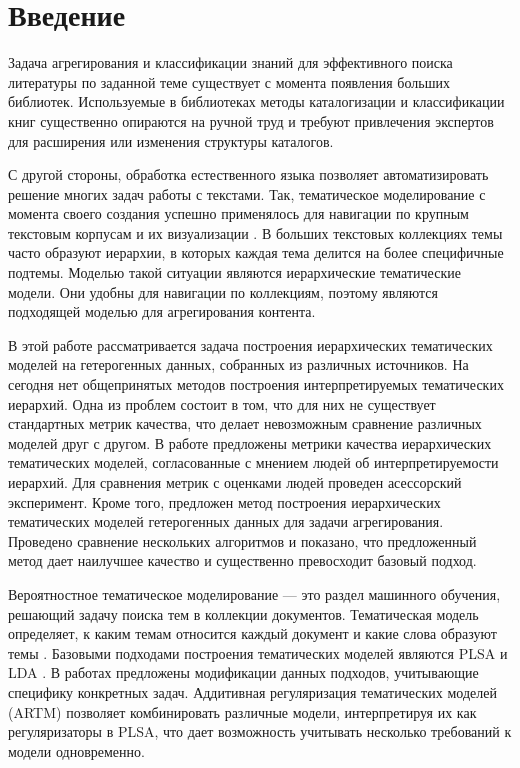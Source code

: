 \chapter{Введение}

Задача агрегирования и классификации знаний для эффективного поиска литературы по заданной теме существует с момента появления больших библиотек. Используемые в библиотеках методы каталогизации и классификации книг \cite{Sill2007} существенно опираются на ручной труд и требуют привлечения экспертов для расширения или изменения структуры каталогов.

С другой стороны, обработка естественного языка позволяет автоматизировать решение многих задач работы с текстами. Так, тематическое моделирование с момента своего создания успешно применялось для навигации по крупным текстовым корпусам и их визуализации \cite{Blei2007, Chaney2012, Chuang2012}. В больших текстовых коллекциях темы часто образуют иерархии, в которых каждая тема делится на более специфичные подтемы. Моделью такой ситуации являются иерархические тематические модели. Они удобны для навигации по коллекциям, поэтому являются подходящей моделью для агрегирования контента. 

В этой работе рассматривается задача построения иерархических тематических моделей на гетерогенных данных, собранных из различных источников. На сегодня нет общепринятых методов построения интерпретируемых тематических иерархий. Одна из проблем состоит в том, что для них не существует стандартных метрик качества, что делает невозможным сравнение различных моделей друг с другом. В работе предложены метрики качества иерархических тематических моделей, согласованные с мнением людей об интерпретируемости иерархий. Для сравнения метрик с оценками людей проведен асессорский эксперимент. Кроме того, предложен метод построения иерархических тематических моделей гетерогенных данных для задачи агрегирования. Проведено сравнение нескольких алгоритмов и показано, что предложенный метод дает наилучшее качество и существенно превосходит базовый подход. 

Вероятностное тематическое моделирование --- это  раздел машинного обучения, решающий задачу поиска тем в коллекции документов. Тематическая модель определяет, к каким темам относится каждый документ и какие слова образуют темы \cite{Blei2012}. Базовыми подходами построения тематических моделей являются PLSA \cite{PLSA} и LDA \cite{LDA}. В работах \cite{extLDA1,extLDA2, extLDA3} предложены модификации данных подходов, учитывающие специфику конкретных задач. Аддитивная регуляризация тематических
моделей (ARTM) \cite{ARTM1, ARTM2, ARTM3, ARTM4} позволяет комбинировать различные модели, интерпретируя их как регуляризаторы в PLSA, что дает возможность учитывать несколько требований к модели одновременно.

